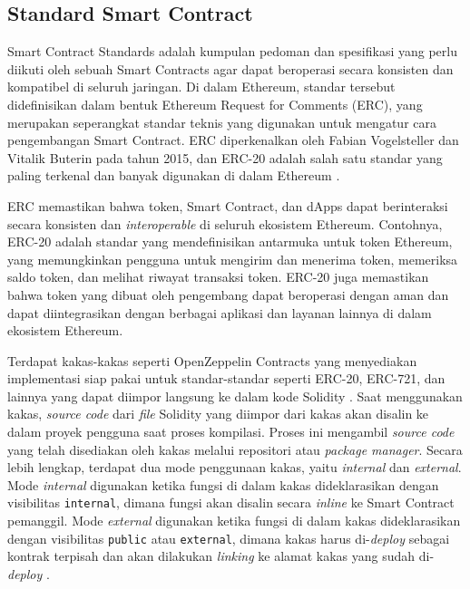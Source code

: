 \subsection{Standard Smart Contract}
\label{subsec:standard-sc}

Smart Contract Standards adalah kumpulan pedoman dan spesifikasi yang perlu diikuti oleh sebuah Smart Contracts agar dapat beroperasi secara konsisten dan kompatibel di seluruh jaringan. Di dalam Ethereum, standar tersebut didefinisikan dalam bentuk Ethereum Request for Comments (ERC), yang merupakan seperangkat standar teknis yang digunakan untuk mengatur cara pengembangan Smart Contract. ERC diperkenalkan oleh Fabian Vogelsteller dan Vitalik Buterin pada tahun 2015, dan ERC-20 adalah salah satu standar yang paling terkenal dan banyak digunakan di dalam Ethereum \parencite{vogelsteller2015erc20}.

ERC memastikan bahwa token, Smart Contract, dan dApps dapat berinteraksi secara konsisten dan \textit{interoperable} di seluruh ekosistem Ethereum. Contohnya, ERC-20 adalah standar yang mendefinisikan antarmuka untuk token Ethereum, yang memungkinkan pengguna untuk mengirim dan menerima token, memeriksa saldo token, dan melihat riwayat transaksi token. ERC-20 juga memastikan bahwa token yang dibuat oleh pengembang dapat beroperasi dengan aman dan dapat diintegrasikan dengan berbagai aplikasi dan layanan lainnya di dalam ekosistem Ethereum.

Terdapat kakas-kakas seperti OpenZeppelin Contracts yang menyediakan implementasi siap pakai untuk standar-standar seperti ERC-20, ERC-721, dan lainnya yang dapat diimpor langsung ke dalam kode Solidity \parencite{openzeppelin_contracts_5x}. Saat menggunakan kakas, \textit{source code} dari \textit{file} Solidity yang diimpor dari kakas akan disalin ke dalam proyek pengguna saat proses kompilasi. Proses ini mengambil \textit{source code} yang telah disediakan oleh kakas melalui repositori atau \textit{package manager}. Secara lebih lengkap, terdapat dua mode penggunaan kakas, yaitu \textit{internal} dan \textit{external}. Mode \textit{internal} digunakan ketika fungsi di dalam kakas dideklarasikan dengan visibilitas \texttt{internal}, dimana fungsi akan disalin secara \textit{inline} ke Smart Contract pemanggil. Mode \textit{external} digunakan ketika fungsi di dalam kakas dideklarasikan dengan visibilitas \texttt{public} atau \texttt{external}, dimana kakas harus di-\textit{deploy} sebagai kontrak terpisah dan akan dilakukan \textit{linking} ke alamat kakas yang sudah di-\textit{deploy} \parencite{solidity_lowlevelcalls}.

